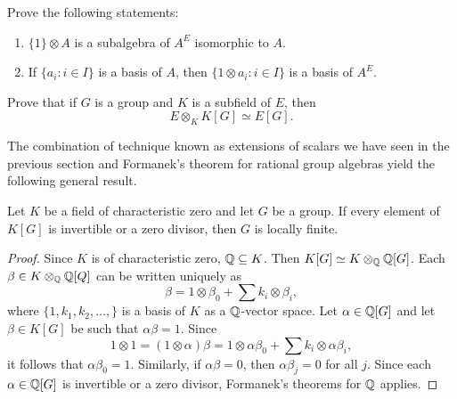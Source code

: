 \begin{exercise}
    Prove the following statements:
    \begin{enumerate}
		\item $\{1\}\otimes A$ is a subalgebra of $A^E$ isomorphic to $A$.
		\item If $\{a_i:i\in I\}$ is a basis of $A$, then $\{1\otimes a_i:i\in
			I\}$ is a basis of $A^E$.
	\end{enumerate}
\end{exercise}

\begin{exercise}
	Prove that if $G$ is a group and $K$ is a subfield of $E$, then
	\[
	E\otimes_K K[G]\simeq E[G].
	\]
\end{exercise}


The combination of technique known as extensions of scalars we have seen in the previous section
and Formanek's theorem for rational group algebras 
yield the following general result. 

\begin{theorem}[Formanek]
	Let $K$ be a field of characteristic zero and let $G$ be a group. 
	If every element of $K[G]$ is invertible or a zero divisor, 
	then $G$ is locally finite. 
\end{theorem}

\begin{proof}
	Since $K$ is of characteristic zero, $\mathbb{Q}\subseteq K$. Then $K[G]\simeq
	K\otimes_{\mathbb{Q}}\mathbb{Q}[G]$. Each $\beta\in K\otimes_{\mathbb{Q}}\mathbb{Q}[Q]$ can be written
	uniquely as 
	\[
		\beta=1\otimes\beta_0+\sum k_i\otimes\beta_i,
	\]
	where $\{1,k_1,k_2,\dots,\}$ is a basis of $K$ as a $\mathbb{Q}$-vector space. 
	Let $\alpha\in\mathbb{Q}[G]$ and let $\beta\in K[G]$ be such that $\alpha\beta=1$. Since
	\[
	1\otimes 1=(1\otimes\alpha)\beta=1\otimes \alpha\beta_0+\sum k_i\otimes \alpha\beta_i,
	\]
	it follows that $\alpha\beta_0=1$. Similarly, if
	$\alpha\beta=0$, then $\alpha\beta_j=0$ for all $j$. Since 
	each $\alpha\in\mathbb{Q}[G]$ is invertible or a zero divisor, Formanek's theorems 
	for $\mathbb{Q}$ applies. 
\end{proof}



